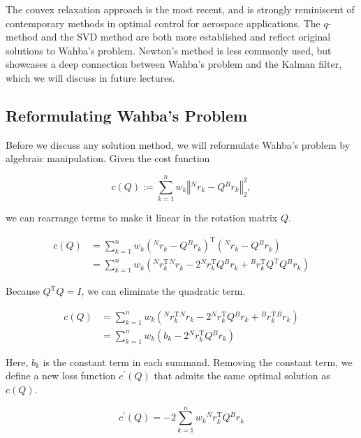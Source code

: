 \documentclass[12pt]{article}
\begin{document}
	The convex relaxation approach is the most recent, and is strongly reminiscent of contemporary methods in optimal control for aerospace applications.  The \( q \)-method and the SVD method are both more established and reflect original solutions to Wahba's problem.  Newton's method is less commonly used, but showcases a deep connection between Wahba's problem and the Kalman filter, which we will discuss in future lectures.
	
	\subsection{Reformulating Wahba's Problem}
	
	Before we discuss any solution method, we will reformulate Wahba's problem by algebraic manipulation.  Given the cost function
	
	\begin{equation*}
		c(Q) := \sum_{k=1}^n w_k \left\Vert {}^N r_k - Q {}^B r_k \right\Vert_2^2 ,
	\end{equation*}
	
	we can rearrange terms to make it linear in the rotation matrix \( Q \).
	
	\begin{align*}
		c(Q) &= \sum_{k=1}^n w_k \left( {}^N r_k - Q {}^B r_k \right)^\mathrm{T} \left( {}^N r_k - Q {}^B r_k \right) \\
		&= \sum_{k=1}^n w_k \left( {}^N r_k^\mathrm{T} {}^N r_k - 2 {}^N r_k^\mathrm{T} Q {}^B r_k + {}^B r_k^\mathrm{T} Q^\mathrm{T} Q {}^B r_k \right)
	\end{align*}
	
	Because \( Q^\mathrm{T} Q = I \), we can eliminate the quadratic term.
	
	\begin{align*}
		c(Q) &= \sum_{k=1}^n w_k \left( {}^N r_k^\mathrm{T} {}^N r_k - 2 {}^N r_k^\mathrm{T} Q {}^B r_k + {}^B r_k^\mathrm{T} {}^B r_k \right) \\
		&= \sum_{k=1}^n w_k \left( b_k - 2 {}^N r_k^\mathrm{T} Q {}^B r_k \right)
	\end{align*}
	
	Here, \( b_k \) is the constant term in each summand.  Removing the constant term, we define a new loss function \( c^\prime(Q) \) that admits the same optimal solution as \( c(Q) \).
	
	\begin{equation}
		c^\prime(Q) = -2 \sum_{k=1}^n w_k {}^N r_k^\mathrm{T} Q {}^B r_k
	\end{equation}
	
\end{document}
